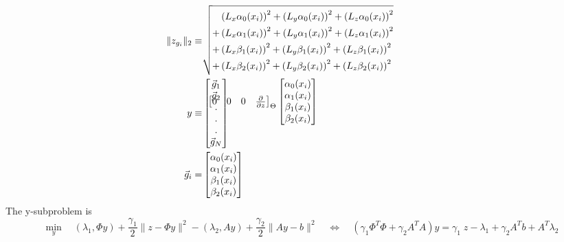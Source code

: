 \documentclass[10pt]{amsart}
\begin{document}
\[{\begin{bmatrix}
 0 & 0 & 0 & \frac{\partial }{\partial z} \\
\end{bmatrix} 
}_{\Theta }
\begin{bmatrix} 
 \alpha_0(x_i) \\
 \alpha_1(x_i) \\
  \beta_1(x_i) \\
  \beta_2(x_i) \\
\end{bmatrix} 
\qquad
\hspace{-2.5in}
\begin{split}
\|z_{g_i}\|_2 \equiv &
 \sqrt{
   \begin{split}
    &\left(L_x \alpha_0 (x_i) \right)^2 + \left(L_y \alpha_0 (x_i) \right)^2 + \left(L_z \alpha_0 (x_i) \right)^2 \\ 
   +&\left(L_x \alpha_1 (x_i) \right)^2 + \left(L_y \alpha_1 (x_i) \right)^2 + \left(L_z \alpha_1 (x_i) \right)^2 \\ 
   +&\left(L_x  \beta_1 (x_i) \right)^2 + \left(L_y  \beta_1 (x_i) \right)^2 + \left(L_z  \beta_1 (x_i) \right)^2 \\ 
   +&\left(L_x  \beta_2 (x_i) \right)^2 + \left(L_y  \beta_2 (x_i) \right)^2 + \left(L_z  \beta_2 (x_i) \right)^2 \\ 
   \end{split}
  }
\\
y
\equiv &
\begin{bmatrix} 
\vec{g}_1\\
\vec{g}_2\\
     .   \\
     .   \\
     .   \\
\vec{g}_N\\
\end{bmatrix} 
\\
\vec{g}_i
= &
\begin{bmatrix} 
 \alpha_0(x_i) \\
 \alpha_1(x_i) \\
  \beta_1(x_i) \\
  \beta_2(x_i) \\
\end{bmatrix} 
\end{split}
\]
The y-subproblem is
\[
   \min_{y} \quad
          \left(\lambda_1, \Phi y\right) + \frac{\gamma_1}{2} \|z -\Phi y\|^2
        - \left(\lambda_2,Ay \right) + \frac{\gamma_2}{2} \|A y - b\|^2
\quad \Leftrightarrow \quad
   \left(\gamma_1 \Phi^T \Phi  + \gamma_2 A^T A  \right) y
    = 
    \gamma_1 \;  z  -\lambda_1 + \gamma_2 A^T b + A^T  \lambda_2
\]
\end{document}
